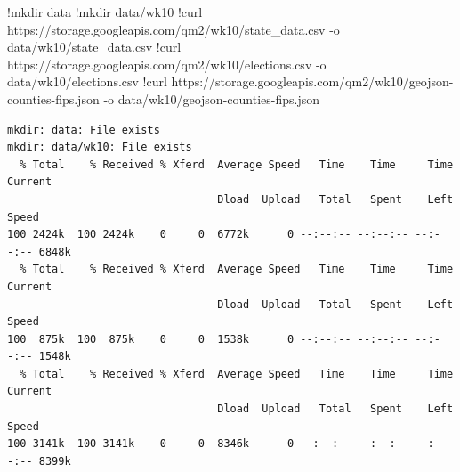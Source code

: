\documentclass[
  letterpaper,
  DIV=11,
  numbers=noendperiod]{scrreprt}
\newenvironment{Shaded}{\begin{snugshade}}{\end{snugshade}}
\newcommand{\NormalTok}[1]{\textcolor[rgb]{0.00,0.23,0.31}{#1}}
\newcommand{\OperatorTok}[1]{\textcolor[rgb]{0.37,0.37,0.37}{#1}}
\begin{document}
\begin{Shaded}
\begin{Highlighting}[]
\OperatorTok{!}\NormalTok{mkdir data}
\OperatorTok{!}\NormalTok{mkdir data}\OperatorTok{/}\NormalTok{wk10}
\OperatorTok{!}\NormalTok{curl https:}\OperatorTok{//}\NormalTok{storage.googleapis.com}\OperatorTok{/}\NormalTok{qm2}\OperatorTok{/}\NormalTok{wk10}\OperatorTok{/}\NormalTok{state\_data.csv }\OperatorTok{{-}}\NormalTok{o data}\OperatorTok{/}\NormalTok{wk10}\OperatorTok{/}\NormalTok{state\_data.csv}
\OperatorTok{!}\NormalTok{curl https:}\OperatorTok{//}\NormalTok{storage.googleapis.com}\OperatorTok{/}\NormalTok{qm2}\OperatorTok{/}\NormalTok{wk10}\OperatorTok{/}\NormalTok{elections.csv }\OperatorTok{{-}}\NormalTok{o data}\OperatorTok{/}\NormalTok{wk10}\OperatorTok{/}\NormalTok{elections.csv}
\OperatorTok{!}\NormalTok{curl https:}\OperatorTok{//}\NormalTok{storage.googleapis.com}\OperatorTok{/}\NormalTok{qm2}\OperatorTok{/}\NormalTok{wk10}\OperatorTok{/}\NormalTok{geojson}\OperatorTok{{-}}\NormalTok{counties}\OperatorTok{{-}}\NormalTok{fips.json }\OperatorTok{{-}}\NormalTok{o data}\OperatorTok{/}\NormalTok{wk10}\OperatorTok{/}\NormalTok{geojson}\OperatorTok{{-}}\NormalTok{counties}\OperatorTok{{-}}\NormalTok{fips.json}
\end{Highlighting}
\end{Shaded}

\begin{verbatim}
mkdir: data: File exists
mkdir: data/wk10: File exists
  % Total    % Received % Xferd  Average Speed   Time    Time     Time  Current
                                 Dload  Upload   Total   Spent    Left  Speed
100 2424k  100 2424k    0     0  6772k      0 --:--:-- --:--:-- --:--:-- 6848k
  % Total    % Received % Xferd  Average Speed   Time    Time     Time  Current
                                 Dload  Upload   Total   Spent    Left  Speed
100  875k  100  875k    0     0  1538k      0 --:--:-- --:--:-- --:--:-- 1548k
  % Total    % Received % Xferd  Average Speed   Time    Time     Time  Current
                                 Dload  Upload   Total   Spent    Left  Speed
100 3141k  100 3141k    0     0  8346k      0 --:--:-- --:--:-- --:--:-- 8399k
\end{verbatim}
\end{document}
